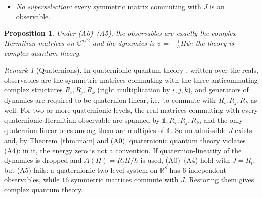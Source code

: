 \documentclass[11pt]{article}
\newtheorem{proposition}[theorem]{Proposition}
\theoremstyle{remark}
\newtheorem{remark}[theorem]{Remark}
\newcommand{\R}{\mathbb{R}}
\newcommand{\C}{\mathbb{C}}
\newcommand{\one}{\mathbb{1}}
\begin{document}
\begin{itemize}
\item[(A5)] \emph{No superselection:} every symmetric matrix commuting with $J$ is an observable.
\end{itemize}

\begin{proposition}\label{prop:complex}
Under (A0)--(A5), the observables are exactly the complex Hermitian matrices on $\C^{n/2}$ and the dynamics is $\dot\psi=-\frac{i}{\hbar}H\psi$: the theory is complex quantum theory.
\end{proposition}

\begin{remark}[Quaternions]\label{rem:quat}
In quaternionic quantum theory \cite{Adler}, written over the reals, observables are the symmetric matrices commuting with the three anticommuting complex structures $R_i,R_j,R_k$ (right multiplication by $i,j,k$), and generators of dynamics are required to be quaternion-linear, i.e.\ to commute with $R_i,R_j,R_k$ as well. For two or more quaternionic levels, the real matrices commuting with every quaternionic Hermitian observable are spanned by $\one,R_i,R_j,R_k$, and the only quaternion-linear ones among them are multiples of $\one$. So no admissible $J$ exists and, by Theorem~\ref{thm:main} and (A0), quaternionic quantum theory violates (A4): in it, the energy zero is not a convention. If quaternion-linearity of the dynamics is dropped and $A(H)=R_iH/\hbar$ is used, (A0)--(A4) hold with $J=R_i$, but (A5) fails: a quaternionic two-level system on $\R^8$ has $6$ independent observables, while $16$ symmetric matrices commute with $J$. Restoring them gives complex quantum theory.
\end{remark}
\end{document}
